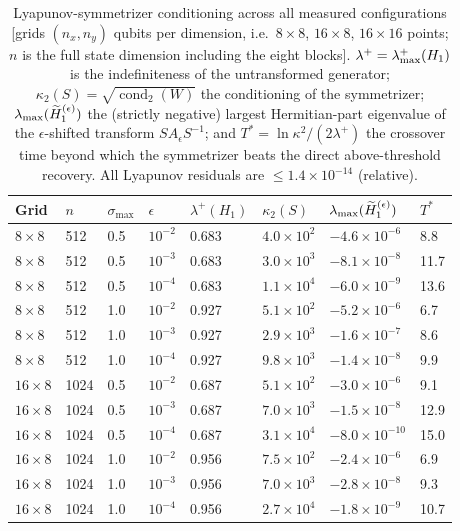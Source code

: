 \begin{table}
\caption{Lyapunov-symmetrizer conditioning across all measured
configurations [grids $(n_x,n_y)$ qubits per dimension, i.e.\ $8\times8$,
$16\times8$, $16\times16$ points; $n$ is the full state dimension
including the eight blocks].  $\lambda^{+}=\lambda_{\max}^{+}(H_1)$ is the
indefiniteness of the untransformed generator;
$\kappa_2(S)=\sqrt{\operatorname{cond}_2(W)}$ the conditioning of the
symmetrizer; $\lambda_{\max}(\widetilde{H}_1^{(\epsilon)})$ the (strictly negative) largest
Hermitian-part eigenvalue of the $\epsilon$-shifted transform
$SA_\epsilon S^{-1}$; and $T^{*}=\ln\kappa^{2}/(2\lambda^{+})$ the
crossover time beyond which the symmetrizer beats the direct
above-threshold recovery.  All Lyapunov residuals are
$\le1.4\times10^{-14}$ (relative).}
\label{ch3:tab:kappa}
\begin{tabular}{llllllll}
\toprule
Grid & $n$ & $\sigma_{\max}$ & $\epsilon$ & $\lambda^{+}(H_1)$ &
$\kappa_2(S)$ & $\lambda_{\max}(\widetilde{H}_1^{(\epsilon)})$ & $T^{*}$ \\
\midrule
$8\times8$ & 512 & 0.5 & $10^{-2}$ & 0.683 & $4.0\times10^{2}$ & $-4.6\times10^{-6}$ & 8.8 \\
$8\times8$ & 512 & 0.5 & $10^{-3}$ & 0.683 & $3.0\times10^{3}$ & $-8.1\times10^{-8}$ & 11.7 \\
$8\times8$ & 512 & 0.5 & $10^{-4}$ & 0.683 & $1.1\times10^{4}$ & $-6.0\times10^{-9}$ & 13.6 \\
$8\times8$ & 512 & 1.0 & $10^{-2}$ & 0.927 & $5.1\times10^{2}$ & $-5.2\times10^{-6}$ & 6.7 \\
$8\times8$ & 512 & 1.0 & $10^{-3}$ & 0.927 & $2.9\times10^{3}$ & $-1.6\times10^{-7}$ & 8.6 \\
$8\times8$ & 512 & 1.0 & $10^{-4}$ & 0.927 & $9.8\times10^{3}$ & $-1.4\times10^{-8}$ & 9.9 \\
$16\times8$ & 1024 & 0.5 & $10^{-2}$ & 0.687 & $5.1\times10^{2}$ & $-3.0\times10^{-6}$ & 9.1 \\
$16\times8$ & 1024 & 0.5 & $10^{-3}$ & 0.687 & $7.0\times10^{3}$ & $-1.5\times10^{-8}$ & 12.9 \\
$16\times8$ & 1024 & 0.5 & $10^{-4}$ & 0.687 & $3.1\times10^{4}$ & $-8.0\times10^{-10}$ & 15.0 \\
$16\times8$ & 1024 & 1.0 & $10^{-2}$ & 0.956 & $7.5\times10^{2}$ & $-2.4\times10^{-6}$ & 6.9 \\
$16\times8$ & 1024 & 1.0 & $10^{-3}$ & 0.956 & $7.0\times10^{3}$ & $-2.8\times10^{-8}$ & 9.3 \\
$16\times8$ & 1024 & 1.0 & $10^{-4}$ & 0.956 & $2.7\times10^{4}$ & $-1.8\times10^{-9}$ & 10.7 \\

\end{tabular}
\end{table}
